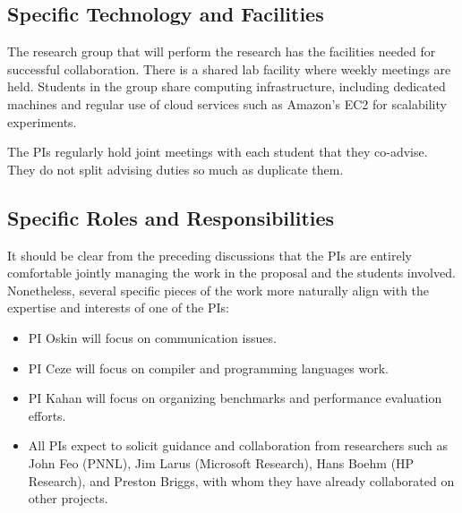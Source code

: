 \subsection*{Specific Technology and Facilities}

The research group that will perform the research has the facilities
needed for successful collaboration.  There is a shared lab facility
where weekly meetings are held.  Students in the group share computing
infrastructure, including dedicated machines and regular use of cloud
services such as Amazon's EC2 for scalability experiments.

The PIs regularly hold joint meetings with each student that they
co-advise.  They do not split advising duties so much as duplicate
them.

\subsection*{Specific Roles and Responsibilities}

It should be clear from the preceding discussions that the PIs are
entirely comfortable jointly managing the work in the proposal and the
students involved.  Nonetheless, several specific pieces of the work
more naturally align with the expertise and interests of one of the
PIs:

\begin{itemize}
\item PI Oskin will focus on communication issues. 
\item PI Ceze will focus on compiler and programming languages work.
\item PI Kahan will focus on organizing benchmarks and performance evaluation efforts.
\item All PIs expect to solicit guidance and collaboration from
  researchers such as John Feo (PNNL), Jim Larus (Microsoft Research), Hans
  Boehm (HP Research), and Preston Briggs,  with whom
  they have already collaborated on other projects.
\end{itemize}




